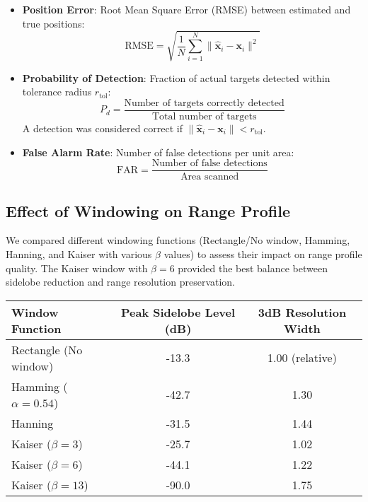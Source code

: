 \documentclass[11pt,a4paper]{article}
\begin{document}
\begin{itemize}
    \item \textbf{Position Error}: Root Mean Square Error (RMSE) between estimated and true positions:
    \begin{equation}
    \text{RMSE} = \sqrt{\frac{1}{N} \sum_{i=1}^{N} \|\hat{\mathbf{x}}_i - \mathbf{x}_i\|^2}
    \end{equation}
    
    \item \textbf{Probability of Detection}: Fraction of actual targets detected within tolerance radius $r_{\text{tol}}$:
    \begin{equation}
    P_d = \frac{\text{Number of targets correctly detected}}{\text{Total number of targets}}
    \end{equation}
    A detection was considered correct if $\|\hat{\mathbf{x}}_i - \mathbf{x}_i\| < r_{\text{tol}}$.
    
    \item \textbf{False Alarm Rate}: Number of false detections per unit area:
    \begin{equation}
    \text{FAR} = \frac{\text{Number of false detections}}{\text{Area scanned}}
    \end{equation}
\end{itemize}

\subsection{Effect of Windowing on Range Profile}

We compared different windowing functions (Rectangle/No window, Hamming, Hanning, and Kaiser with various $\beta$ values) to assess their impact on range profile quality. The Kaiser window with $\beta = 6$ provided the best balance between sidelobe reduction and range resolution preservation.

\begin{tabular}{|l|c|c|}
\hline
\textbf{Window Function} & \textbf{Peak Sidelobe Level (dB)} & \textbf{3dB Resolution Width} \\
\hline
Rectangle (No window) & -13.3 & 1.00 (relative) \\
Hamming ($\alpha = 0.54$) & -42.7 & 1.30 \\
Hanning & -31.5 & 1.44 \\
Kaiser ($\beta = 3$) & -25.7 & 1.02 \\
Kaiser ($\beta = 6$) & -44.1 & 1.22 \\
Kaiser ($\beta = 13$) & -90.0 & 1.75 \\
\hline
\end{tabular}
\end{document}
